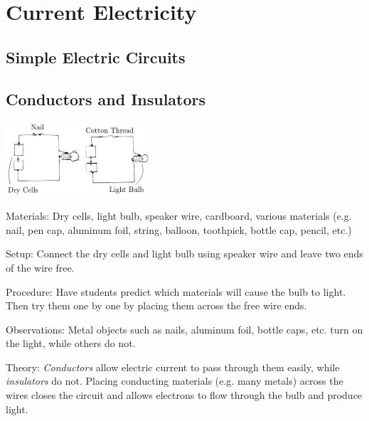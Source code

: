 \section{Current Electricity} 
\label{sec:ii-current-electricity}

\begin{multicols}{2}


\section*{Simple Electric Circuits}


\subsection{Conductors and Insulators}

\begin{center}
\includegraphics[width=0.4\textwidth]{./img/conductors-insulators.png}
\end{center}

\begin{description*}
\item[Materials:]{Dry cells, light bulb, speaker wire, cardboard, various materials (e.g. nail, pen cap, aluminum foil, string, balloon, toothpick, bottle cap, pencil, etc.)}
\item[Setup:]{Connect the dry cells and light bulb using speaker wire and leave two ends of the wire free.}
\item[Procedure:]{Have students predict which materials will cause the bulb to light. Then try them one by one by placing them across the free wire ends.}
\item[Observations:]{Metal objects such as nails, aluminum foil, bottle caps, etc. turn on the light, while others do not.}
\item[Theory:]{\emph{Conductors} allow electric current to pass through them easily, while \emph{insulators} do not. Placing conducting materials (e.g. many metals) across the wires closes the circuit and allows electrons to flow through the bulb and produce light.}
\end{description*}


\end{multicols}
